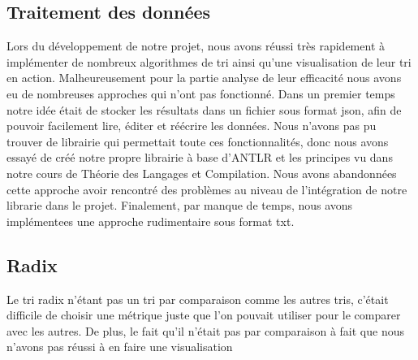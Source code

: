 \documentclass{article}
\begin{document}
\subsection{Traitement des données}
Lors du développement de notre projet, nous avons réussi très rapidement à implémenter de nombreux algorithmes de tri ainsi qu'une visualisation de leur tri en action.\newline
Malheureusement pour la partie analyse de leur efficacité nous avons eu de nombreuses approches qui n'ont pas fonctionné.\newline
Dans un premier temps notre idée était de stocker les résultats dans un fichier sous format json, afin de pouvoir facilement lire, éditer et réécrire les données. Nous n'avons pas pu trouver de librairie qui permettait toute ces fonctionnalités, donc nous avons essayé de créé notre propre librairie à base d'ANTLR et les principes vu dans notre cours de Théorie des Langages et Compilation. Nous avons abandonnées cette approche  avoir rencontré des problèmes au niveau de l'intégration de notre librarie dans le projet.\newline
Finalement, par manque de temps, nous avons implémentees une approche rudimentaire sous format txt.
\subsection{Radix}
Le tri radix n'étant pas un tri par comparaison comme les autres tris, c'était difficile de choisir une métrique juste que l'on pouvait utiliser pour le comparer avec les autres.\newline
De plus, le fait qu'il n'était pas par comparaison à fait que nous n'avons pas réussi à en faire une visualisation
\end{document}
